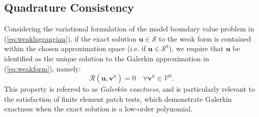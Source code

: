 
\subsection*{Quadrature Consistency}

Considering the variational formulation of the model boundary value problem in (\ref{eq:weaklagrangian}), if the exact solution $\mathbf{u} \in \mathcal{S}$ to the weak form is contained within the chosen approximation space (i.e. if $\mathbf{u} \in \mathcal{S}^h$), we require that $\mathbf{u}$ be identified as the unique solution to the Galerkin approximation in (\ref{eq:weakform}), namely:
\begin{equation}
  \mathcal{R}(\mathbf{u}, \mathbf{v}^h) = 0 \quad \forall \mathbf{v}^h \in \mathcal{V}^h.
\end{equation}
This property is referred to as \textit{Galerkin exactness}, and is particularly relevant to the satisfaction of finite element patch tests, which demonstrate Galerkin exactness when the exact solution is a low-order polynomial.

